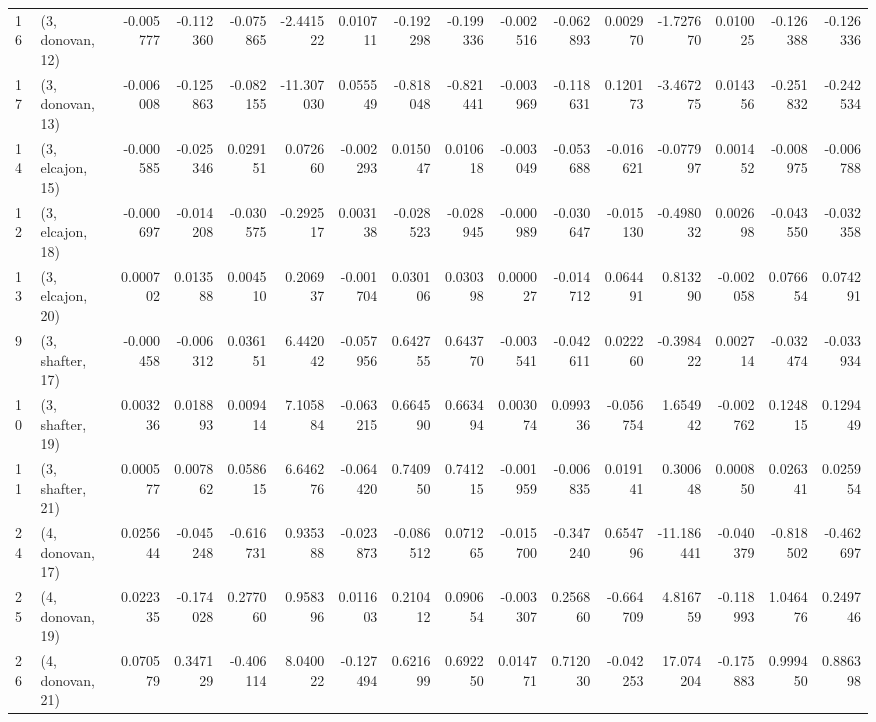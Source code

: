 \begin{tabular}{llrrrrrrrrrrrrrr}
16 &  (3, donovan, 12) &  -0.005777 & -0.112360 & -0.075865 &  -2.441522 &  0.010711 &  -0.192298 & -0.199336 & -0.002516 & -0.062893 &  0.002970 &  -1.727670 &  0.010025 & -0.126388 & -0.126336 \\
17 &  (3, donovan, 13) &  -0.006008 & -0.125863 & -0.082155 & -11.307030 &  0.055549 &  -0.818048 & -0.821441 & -0.003969 & -0.118631 &  0.120173 &  -3.467275 &  0.014356 & -0.251832 & -0.242534 \\
14 &  (3, elcajon, 15) &  -0.000585 & -0.025346 &  0.029151 &   0.072660 & -0.002293 &   0.015047 &  0.010618 & -0.003049 & -0.053688 & -0.016621 &  -0.077997 &  0.001452 & -0.008975 & -0.006788 \\
12 &  (3, elcajon, 18) &  -0.000697 & -0.014208 & -0.030575 &  -0.292517 &  0.003138 &  -0.028523 & -0.028945 & -0.000989 & -0.030647 & -0.015130 &  -0.498032 &  0.002698 & -0.043550 & -0.032358 \\
13 &  (3, elcajon, 20) &   0.000702 &  0.013588 &  0.004510 &   0.206937 & -0.001704 &   0.030106 &  0.030398 &  0.000027 & -0.014712 &  0.064491 &   0.813290 & -0.002058 &  0.076654 &  0.074291 \\
9  &  (3, shafter, 17) &  -0.000458 & -0.006312 &  0.036151 &   6.442042 & -0.057956 &   0.642755 &  0.643770 & -0.003541 & -0.042611 &  0.022260 &  -0.398422 &  0.002714 & -0.032474 & -0.033934 \\
10 &  (3, shafter, 19) &   0.003236 &  0.018893 &  0.009414 &   7.105884 & -0.063215 &   0.664590 &  0.663494 &  0.003074 &  0.099336 & -0.056754 &   1.654942 & -0.002762 &  0.124815 &  0.129449 \\
11 &  (3, shafter, 21) &   0.000577 &  0.007862 &  0.058615 &   6.646276 & -0.064420 &   0.740950 &  0.741215 & -0.001959 & -0.006835 &  0.019141 &   0.300648 &  0.000850 &  0.026341 &  0.025954 \\
24 &  (4, donovan, 17) &   0.025644 & -0.045248 & -0.616731 &   0.935388 & -0.023873 &  -0.086512 &  0.071265 & -0.015700 & -0.347240 &  0.654796 & -11.186441 & -0.040379 & -0.818502 & -0.462697 \\
25 &  (4, donovan, 19) &   0.022335 & -0.174028 &  0.277060 &   0.958396 &  0.011603 &   0.210412 &  0.090654 & -0.003307 &  0.256860 & -0.664709 &   4.816759 & -0.118993 &  1.046476 &  0.249746 \\
26 &  (4, donovan, 21) &   0.070579 &  0.347129 & -0.406114 &   8.040022 & -0.127494 &   0.621699 &  0.692250 &  0.014771 &  0.712030 & -0.042253 &  17.074204 & -0.175883 &  0.999450 &  0.886398 \\

\end{tabular}
